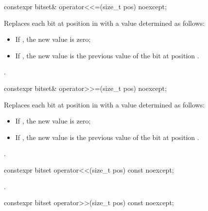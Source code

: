 %
\begin{itemdecl}
constexpr bitset& operator<<=(size_t pos) noexcept;
\end{itemdecl}

\begin{itemdescr}
\pnum
\effects
Replaces each bit at position  in
with a value determined as follows:

\begin{itemize}
\item
If , the new value is zero;
\item
If , the new value is the previous
value of the bit at position .
\end{itemize}

\pnum
\returns
{}.
\end{itemdescr}

%
\begin{itemdecl}
constexpr bitset& operator>>=(size_t pos) noexcept;
\end{itemdecl}

\begin{itemdescr}
\pnum
\effects
Replaces each bit at position  in
with a value determined as follows:

\begin{itemize}
\item
If , the new value is zero;
\item
If , the new value is the previous value of the bit at position .
\end{itemize}

\pnum
\returns
{}.
\end{itemdescr}

%
\begin{itemdecl}
constexpr bitset operator<<(size_t pos) const noexcept;
\end{itemdecl}

\begin{itemdescr}
\pnum
\returns
{}.
\end{itemdescr}

%
\begin{itemdecl}
constexpr bitset operator>>(size_t pos) const noexcept;
\end{itemdecl}

